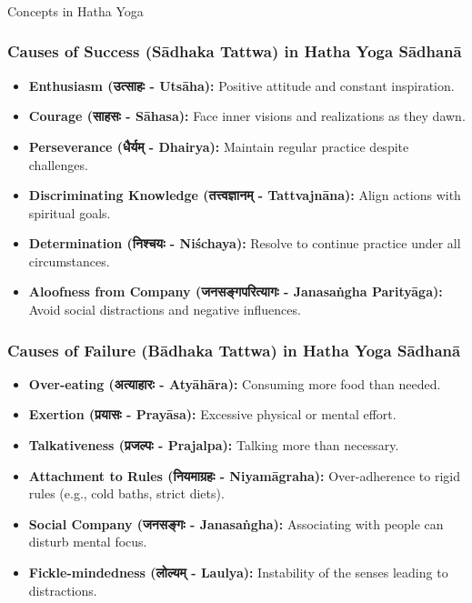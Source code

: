 \begin{frame}[fragile]\frametitle{}
\begin{center}
{\Large Concepts in Hatha Yoga}
\end{center}
\end{frame}

\begin{frame}[fragile]\frametitle{Causes of Success (Sādhaka Tattwa) in Hatha Yoga Sādhanā}
\begin{itemize}
    \item \textbf{Enthusiasm (उत्साहः - Utsāha):} Positive attitude and constant inspiration.
    \item \textbf{Courage (साहसः - Sāhasa):} Face inner visions and realizations as they dawn.
    \item \textbf{Perseverance (धैर्यम् - Dhairya):} Maintain regular practice despite challenges.
    \item \textbf{Discriminating Knowledge (तत्त्वज्ञानम् - Tattvajnāna):} Align actions with spiritual goals.
    \item \textbf{Determination (निश्चयः - Niśchaya):} Resolve to continue practice under all circumstances.
    \item \textbf{Aloofness from Company (जनसङ्गपरित्यागः - Janasaṅgha Parityāga):} Avoid social distractions and negative influences.
\end{itemize}
\end{frame}

\begin{frame}[fragile]\frametitle{Causes of Failure (Bādhaka Tattwa) in Hatha Yoga Sādhanā}
\begin{itemize}
    \item \textbf{Over-eating (अत्याहारः - Atyāhāra):} Consuming more food than needed.
    \item \textbf{Exertion (प्रयासः - Prayāsa):} Excessive physical or mental effort.
    \item \textbf{Talkativeness (प्रजल्पः - Prajalpa):} Talking more than necessary.
    \item \textbf{Attachment to Rules (नियमाग्रहः - Niyamāgraha):} Over-adherence to rigid rules (e.g., cold baths, strict diets).
    \item \textbf{Social Company (जनसङ्गः - Janasaṅgha):} Associating with people can disturb mental focus.
    \item \textbf{Fickle-mindedness (लोल्यम् - Laulya):} Instability of the senses leading to distractions.
\end{itemize}
\end{frame}

